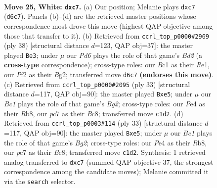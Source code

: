 \documentclass[11pt]{article}
\begin{document}
\clearpage

\begin{figure}[p]\centering
\begin{subfigure}{0.46\textwidth}\centering
\resizebox{\linewidth}{!}{%
\newchessgame
\chessboard[
  setfen={1r1r4/ppp2pk1/3P4/4b1qp/b3Pn2/5QPp/PP3P2/RBB1R1K1 w - - 0 25},
  showmover=false,
  pgfstyle=straightmove, color=movearrow, markmove={d6-c7}
]}
\caption{}
\end{subfigure}\hfill
\begin{subfigure}{0.46\textwidth}\centering
\resizebox{\linewidth}{!}{%
\newchessgame
\chessboard[
  setfen={3rr1k1/pp3ppp/1qp2n2/4b3/8/2P2QPP/PP1B1PB1/1R2R1K1 w - - 5 20},
  showmover=false,
  pgfstyle=straightmove, color=movearrow, markmove={d2-e3}
]}
\caption{}
\end{subfigure}
\\[4pt]
\begin{subfigure}{0.46\textwidth}\centering
\resizebox{\linewidth}{!}{%
\newchessgame
\chessboard[
  setfen={1rbqk1r1/4ppb1/p2p3p/1p2B3/3QP2R/2N5/PPP2PP1/2KR1B2 b - - 0 17},
  showmover=false,
  pgfstyle=straightmove, color=movearrow, markmove={g7-e5}
]}
\caption{}
\end{subfigure}\hfill
\begin{subfigure}{0.46\textwidth}\centering
\resizebox{\linewidth}{!}{%
\newchessgame
\chessboard[
  setfen={1rbqk1r1/4ppb1/p2p3p/1p2B3/3QP2R/2N5/PPP2PP1/2KR1B2 b - - 0 17},
  showmover=false,
  pgfstyle=straightmove, color=movearrow, markmove={g7-e5}
]}
\caption{}
\end{subfigure}
\caption{\textbf{Move 25, White: \texttt{dxc7}.} (a) Our position; Melanie plays \texttt{dxc7} (\texttt{d6c7}). Panels (b)--(d) are the retrieved master positions whose correspondence most drove this move (highest QAP objective among those that transfer to it). (b) Retrieved from \texttt{ccrl\_top\_p0000\#2969} (ply 38) [structural distance $d$=123, QAP obj=37]: the master played \texttt{Be3}; under $\mu$ our \emph{Pd6} plays the role of that game's \emph{Bd2} (a \textbf{cross-type} correspondence); cross-type roles: our \emph{B}c1 as their \emph{R}e1, our \emph{P}f2 as their \emph{B}g2; transferred move \texttt{d6c7} \textbf{(endorses this move)}. (c) Retrieved from \texttt{ccrl\_top\_p0000\#2095} (ply 33) [structural distance $d$=117, QAP obj=90]: the master played \texttt{Bxe5}; under $\mu$ our \emph{Bc1} plays the role of that game's \emph{Bg2}; cross-type roles: our \emph{P}e4 as their \emph{R}b8, our \emph{p}c7 as their \emph{B}c8; transferred move \texttt{c1d2}. (d) Retrieved from \texttt{ccrl\_top\_p0003\#114} (ply 33) [structural distance $d$=117, QAP obj=90]: the master played \texttt{Bxe5}; under $\mu$ our \emph{Bc1} plays the role of that game's \emph{Bg2}; cross-type roles: our \emph{P}e4 as their \emph{R}b8, our \emph{p}c7 as their \emph{B}c8; transferred move \texttt{c1d2}. Synthesis: 1 retrieved analog transferred to \texttt{dxc7} (summed QAP objective 37, the strongest correspondence among the candidate moves); Melanie committed it via the \texttt{search} selector.}
\label{fig:thought-m48}
\end{figure}
\end{document}
